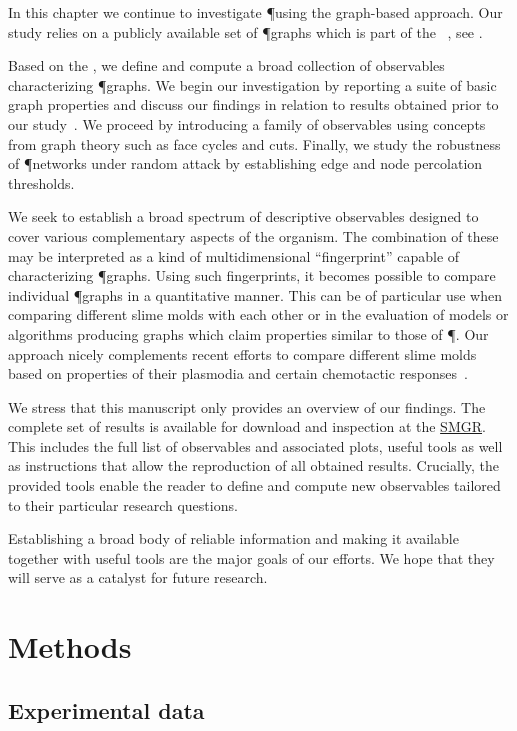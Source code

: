	In this chapter we continue to investigate \P using the graph-based approach. Our study relies on a publicly available set of \P graphs which is part of the \SMGR~\cite{SMGR}, see .

	Based on the \data, we define and compute a broad collection of observables characterizing \P graphs. We begin our investigation by reporting a suite of basic graph properties and discuss our findings in relation to results obtained prior to our study~\cite{baumgarten2010plasmodial}. We proceed by introducing a family of observables using concepts from graph theory such as face cycles and cuts. Finally, we study the robustness of \P networks under random attack by establishing edge and node percolation thresholds. 

	We seek to establish a broad spectrum of descriptive observables designed to cover various complementary aspects of the organism. The combination of these may be interpreted as a kind of multidimensional ``fingerprint'' capable of characterizing \P graphs. Using such fingerprints, it becomes possible to compare individual \P graphs in a quantitative manner. This can be of particular use when comparing different slime molds with each other or in the evaluation of models or algorithms producing graphs which claim properties similar to those of \P. Our approach nicely complements recent efforts to compare different slime molds based on properties of their plasmodia and certain chemotactic responses~\cite{westendorf2016quantitative}.

	We stress that this manuscript only provides an overview of our findings. The complete set of results is available for download and inspection at the \href{http://smgr.mpi-inf.mpg.de}{SMGR}. This includes the full list of observables and associated plots, useful tools as well as instructions that allow the reproduction of all obtained results. Crucially, the provided tools enable the reader to define and compute new observables tailored to their particular research questions.

	Establishing a broad body of reliable information and making it available together with useful tools are the major goals of our efforts. We hope that they will serve as a catalyst for future research.

\section{Methods}

	\subsection{Experimental data}

